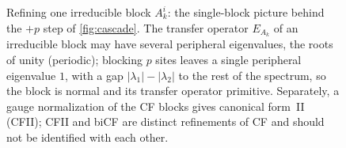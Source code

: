 \begin{figure}[htbp]
    \caption{Refining one irreducible block $A_k^i$: the single-block picture
        behind the $+p$ step of \cref{fig:cascade}. The transfer operator
        $E_{A_k}$ of an irreducible block may have several peripheral
        eigenvalues, the roots of unity (periodic); blocking $p$ sites leaves
        a single peripheral eigenvalue $1$, with a gap $|\lambda_1|-|\lambda_2|$
        to the rest of the spectrum, so the block is normal and its transfer
        operator primitive. Separately, a gauge normalization of the CF
        blocks gives canonical form~II (CFII); CFII and biCF are distinct
        refinements of CF and should not be identified with each
        other.}\label{fig:block_spectrum}
\end{figure}

